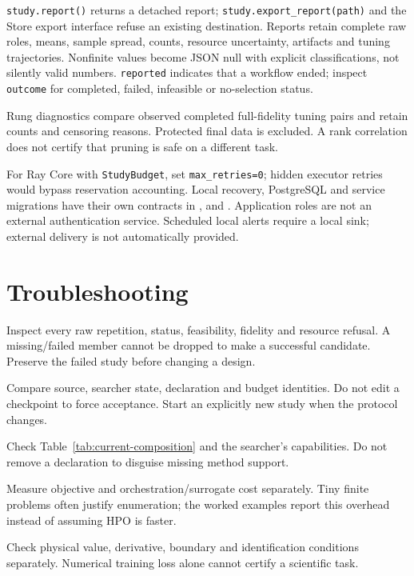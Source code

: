 \texttt{study.report()} returns a detached report;
\texttt{study.export\_report(path)} and the Store export interface refuse an
existing destination. Reports retain complete raw roles, means, sample spread,
counts, resource uncertainty, artifacts and tuning trajectories. Nonfinite
values become JSON null with explicit classifications, not silently valid
numbers. \texttt{reported} indicates that a workflow ended; inspect
\texttt{outcome} for completed, failed, infeasible or no-selection status.

Rung diagnostics compare observed completed full-fidelity tuning pairs and
retain counts and censoring reasons. Protected final data is excluded. A rank
correlation does not certify that pruning is safe on a different task.

For Ray Core with \texttt{StudyBudget}, set \texttt{max\_retries=0}; hidden
executor retries would bypass reservation accounting. Local recovery,
PostgreSQL and service migrations have their own contracts in
,  and
. Application roles are not an external
authentication service. Scheduled local alerts require a local sink; external
delivery is not automatically provided.

\section{Troubleshooting}

\begin{description}[style=nextline]
\item[No valid selection.] Inspect every raw repetition, status, feasibility,
fidelity and resource refusal. A missing/failed member cannot be dropped to
make a successful candidate. Preserve the failed study before changing a design.
\item[Resume refused.] Compare source, searcher state, declaration and budget
identities. Do not edit a checkpoint to force acceptance. Start an explicitly
new study when the protocol changes.
\item[Unsupported composition.] Check Table~\ref{tab:current-composition} and
the searcher's capabilities. Do not remove a declaration to disguise missing
method support.
\item[Search slower than grid.] Measure objective and orchestration/surrogate
cost separately. Tiny finite problems often justify enumeration; the worked
examples report this overhead instead of assuming HPO is faster.
\item[Model looks good but violates task constraints.] Check physical value,
derivative, boundary and identification conditions separately. Numerical
training loss alone cannot certify a scientific task.
\end{description}
